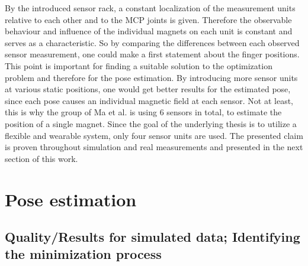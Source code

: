 By the introduced sensor rack, a constant localization of the measurement units relative to each other and to the \ac{MCP} joints is given. Therefore the observable behaviour and influence of the individual magnets on each unit is constant and serves as a characteristic. So by comparing the differences between each observed sensor measurement, one could make a first statement about the finger positions. This point is important for finding a suitable solution to the optimization problem and therefore for the pose estimation. By introducing more sensor units at various static positions, one would get better results for the estimated pose, since each pose causes an individual magnetic field at each sensor. Not at least, this is why the group of Ma et al. is using 6 sensors in total, to estimate the position of a single magnet. Since the goal of the underlying thesis is to utilize a flexible and wearable system, only four sensor units are used. The presented claim is proven throughout simulation and real measurements and presented in the next section of this work.


\section{Pose estimation} \label{sec:estimationRes}

\subsection{Quality/Results for simulated data; Identifying the minimization process} \label{subsec:resSim}


